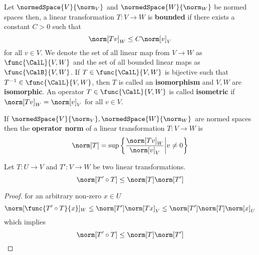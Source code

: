 \begin{definition}
    Let \(\normedSpace{V}{\norm_V}\) and \(\normedSpace{W}{\norm_W}\) be normed spaces then, a linear transformation \(T : V \to W\) is \textbf{bounded} if there exists a constant \(C > 0\) such that
    \begin{equation*}
        \norm[Tv]_W \leq C \norm[v]_V
    \end{equation*}
    for all \(v \in V\). We denote the set of all linear map from \(V \to W\) as \(\func{\CalL}{V,W}\) and the set of all bounded linear maps as \(\func{\CalB}{V,W}\). If \(T \in \func{\CalL}{V,W}\) is bijective such that \(T^{-1} \in \func{\CalL}{V,W}\), then \(T\) is called an \textbf{isomorphism} and \(V,W\) are \textbf{isomorphic}. An operator \(T \in \func{\CalL}{V,W}\) is called \textbf{isometric} if \(\norm[Tv]_W = \norm[v]_V\) for all \(v \in V\).
\end{definition}

\begin{definition}
    If \(\normedSpace{V}{\norm_V},\normedSpace{W}{\norm_W}\) are normed spaces then the \textbf{operator norm} of a linear transformation \(T : V \to W\) is
    \begin{equation*}
        \norm[T] = \sup \left\{\dfrac{\norm[Tv]_W}{\norm[v]_V} \middle| v \neq 0 \right\}
    \end{equation*}
\end{definition}

\begin{proposition}
    Let \(T : U \to V\) and \(T' : V \to W\) be two linear transformations.
    \begin{equation*}
        \norm[T' \circ T] \leq \norm[T] \norm[T']
    \end{equation*}
\end{proposition}

\begin{proof}
    for an arbitrary non-zero \(x \in U\)
    \begin{equation*}
        \norm[\func{T' \circ T}{x}]_W \leq \norm[T'] \norm[Tx]_V \leq \norm[T'] \norm[T] \norm[x]_U
    \end{equation*}
    which implies
    \begin{equation*}
        \norm[T' \circ T] \leq \norm[T] \norm[T']
    \end{equation*}
\end{proof}

